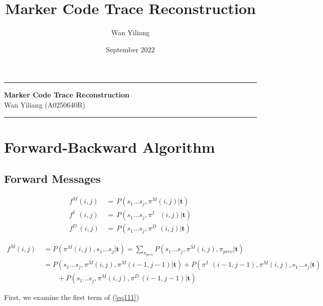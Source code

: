 \documentclass[10pt]{article}
\title{Marker Code Trace Reconstruction}
\author{Wan Yiliang}
\date{September 2022}
\begin{document}
\begin{center}
\hrule
\vspace{.4cm}
{\bf {\Huge Marker Code Trace Reconstruction}}
\vspace{.2cm} \\
Wan Yiliang  (A0250640R) 
\end{center}
\vspace{.1cm}
\hrule

\section{Forward-Backward Algorithm}

  \subsection{Forward Messages}

    \begin{equation}
    \begin{aligned}
      f^{M}(i, j) \,&=\, P(s_1...s_j, \pi^M(i, j) | \mathbf{t}) \\
      f^{I\;\;}(i, j) \,&=\, P(s_1...s_j, \pi^{I\;\;}\,\,(i, j) | \mathbf{t}) \\
      f^{D\;}(i, j) \,&=\, P(s_1...s_j, \pi^{D\;}\,(i, j) | \mathbf{t})
    \end{aligned}
    \end{equation}

    \begin{equation} \label{eq111}
    \begin{aligned}
      f^{M}(i, j) \
        &= P(\pi^M(i, j), s_1...s_j | \mathbf{t}) = \sum\nolimits_{\pi_{prev}} P(s_1...s_j, \pi^M(i, j), \pi_{prev} | \mathbf{t}) \\
        &= P(s_1...s_j, \pi^M(i, j), \pi^M(i-1, j-1) | \mathbf{t}) + P(\pi^{I\;\;}(i-1, j-1), \pi^M(i, j), s_1...s_j | \mathbf{t})  \\
        &\qquad + P(s_1...s_j, \pi^M(i, j), \pi^{D\;}(i-1, j-1) | \mathbf{t})
    \end{aligned}
    \end{equation}

    First, we examine the first term of (\ref{eq111})
\end{document}
